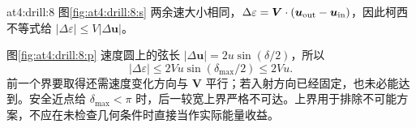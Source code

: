 \begin{drillsolution}{at4:drill:8}
  图\ref{fig:at4:drill:8:s} 两余速大小相同，$\Delta\varepsilon=\bm V\cdot(\bm u_{\rm out}-\bm u_{\rm in})$，因此柯西不等式给 $|\Delta\varepsilon|\le V|\Delta\bm u|$。

  图\ref{fig:at4:drill:8:p} 速度圆上的弦长 $|\Delta\bm u|=2u\sin(\delta/2)$，所以
  \[|\Delta\varepsilon|\le2Vu\sin(\delta_{\max}/2)\le2Vu.
  \]
  前一个界要取得还需速度变化方向与 $\bm V$ 平行；若入射方向已经固定，也未必能达到。安全近点给 $\delta_{\max}<\pi$ 时，后一较宽上界严格不可达。上界用于排除不可能方案，不应在未检查几何条件时直接当作实际能量收益。\end{drillsolution}
